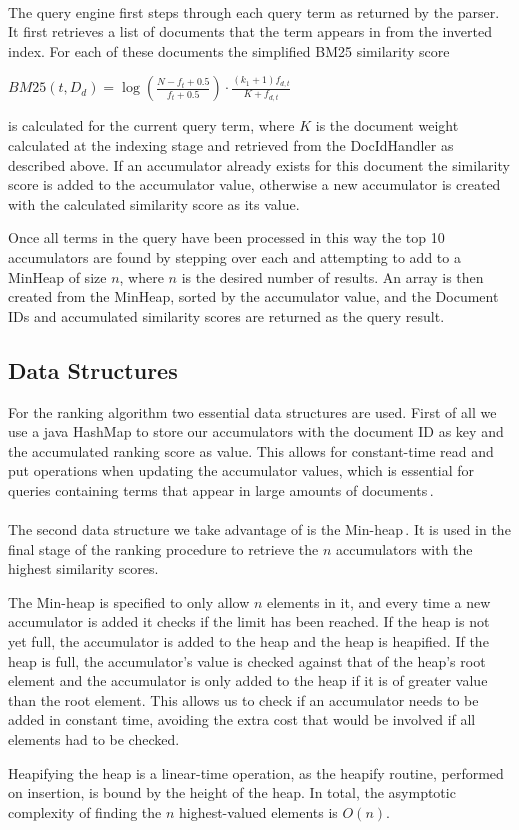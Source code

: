 \paragraph*{}
The query engine first steps through each query term as returned by the parser. It first retrieves a list of documents that the term appears in from the inverted index. For each of these documents the simplified BM25 similarity score\\
\begin{center}
$BM25(t, D_d) = \log \left( \frac{N - f_t + 0.5}{f_t + 0.5} \right) \cdot \frac{(k_1 + 1) f_{d,t}}{K + f_{d,t}}$\\
\end{center}
is calculated for the current query term, where $K$ is the document weight calculated at the indexing stage and retrieved from the DocIdHandler as described above.
If an accumulator already exists for this document the similarity score is added to the accumulator value, otherwise a new accumulator is created with the calculated similarity score as its value.

Once all terms in the query have been processed in this way the top 10 accumulators are found by stepping over each and attempting to add to a MinHeap of size $n$, where $n$ is the desired number of results. An array is then created from the MinHeap, sorted by the accumulator value, and the Document IDs and accumulated similarity scores are returned as the query result.

\subsection*{Data Structures}
For the ranking algorithm two essential data structures are used. First of all we use a java HashMap to store our accumulators with the document ID as key and the accumulated ranking score as value. This allows for constant-time read and put operations when updating the accumulator values, which is essential for queries containing terms that appear in large amounts of documents\,\cite{hashmap}.

\paragraph*{}
The second data structure we take advantage of is the Min-heap\,\cite{wolfram13}. It is used in the final stage of the ranking procedure to retrieve the $n$ accumulators with the highest similarity scores.

The Min-heap is specified to only allow $n$ elements in it, and every time a new accumulator is added it checks if the limit has been reached. If the heap is not yet full, the accumulator is added to the heap and the heap is heapified. If the heap is full, the accumulator's value is checked against that of the heap's root element and the accumulator is only added to the heap if it is of greater value than the root element. This allows us to check if an accumulator needs to be added in constant time, avoiding the extra cost that would be involved if all elements had to be checked.

Heapifying the heap is a linear-time operation, as the heapify routine, performed on insertion, is bound by the height of the heap. In total, the asymptotic complexity of finding the $n$ highest-valued elements is $O(n)$.
